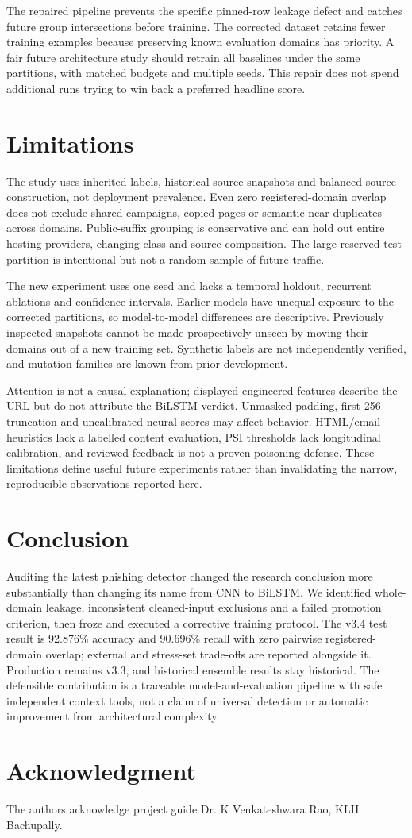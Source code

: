 \documentclass[conference,a4paper]{IEEEtran}
\begin{document}
The repaired pipeline prevents the specific pinned-row leakage defect and catches future group intersections before training. The corrected dataset retains fewer training examples because preserving known evaluation domains has priority. A fair future architecture study should retrain all baselines under the same partitions, with matched budgets and multiple seeds. This repair does not spend additional runs trying to win back a preferred headline score.

\section{Limitations}
The study uses inherited labels, historical source snapshots and balanced-source construction, not deployment prevalence. Even zero registered-domain overlap does not exclude shared campaigns, copied pages or semantic near-duplicates across domains. Public-suffix grouping is conservative and can hold out entire hosting providers, changing class and source composition. The large reserved test partition is intentional but not a random sample of future traffic.

The new experiment uses one seed and lacks a temporal holdout, recurrent ablations and confidence intervals. Earlier models have unequal exposure to the corrected partitions, so model-to-model differences are descriptive. Previously inspected snapshots cannot be made prospectively unseen by moving their domains out of a new training set. Synthetic labels are not independently verified, and mutation families are known from prior development.

Attention is not a causal explanation; displayed engineered features describe the URL but do not attribute the BiLSTM verdict. Unmasked padding, first-256 truncation and uncalibrated neural scores may affect behavior. HTML/email heuristics lack a labelled content evaluation, PSI thresholds lack longitudinal calibration, and reviewed feedback is not a proven poisoning defense. These limitations define useful future experiments rather than invalidating the narrow, reproducible observations reported here.

\section{Conclusion}
Auditing the latest phishing detector changed the research conclusion more substantially than changing its name from CNN to BiLSTM. We identified whole-domain leakage, inconsistent cleaned-input exclusions and a failed promotion criterion, then froze and executed a corrective training protocol. The v3.4 test result is 92.876\% accuracy and 90.696\% recall with zero pairwise registered-domain overlap; external and stress-set trade-offs are reported alongside it. Production remains v3.3, and historical ensemble results stay historical. The defensible contribution is a traceable model-and-evaluation pipeline with safe independent context tools, not a claim of universal detection or automatic improvement from architectural complexity.
\section*{Acknowledgment}
The authors acknowledge project guide Dr. K Venkateshwara Rao, KLH Bachupally.

\end{document}

